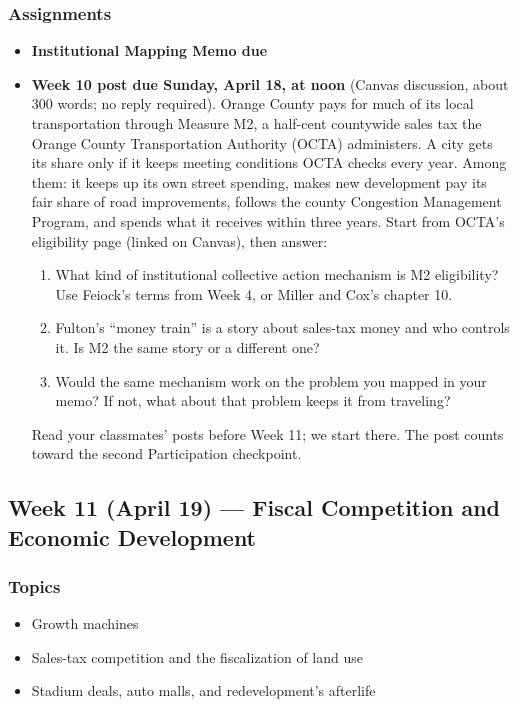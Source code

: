 \documentclass[12pt]{article}
\begin{document}
    \subsubsection*{Assignments}
        \begin{itemize}
            \item \textbf{Institutional Mapping Memo due}
            \item \textbf{Week 10 post due Sunday, April 18, at noon} (Canvas discussion, about 300 words; no reply required). Orange County pays for much of its local transportation through Measure M2, a half-cent countywide sales tax the Orange County Transportation Authority (OCTA) administers. A city gets its share only if it keeps meeting conditions OCTA checks every year. Among them: it keeps up its own street spending, makes new development pay its fair share of road improvements, follows the county Congestion Management Program, and spends what it receives within three years. Start from OCTA's eligibility page (linked on Canvas), then answer:
            \begin{enumerate}
                \item What kind of institutional collective action mechanism is M2 eligibility? Use Feiock's terms from Week 4, or Miller and Cox's chapter 10.
                \item Fulton's ``money train'' is a story about sales-tax money and who controls it. Is M2 the same story or a different one?
                \item Would the same mechanism work on the problem you mapped in your memo? If not, what about that problem keeps it from traveling?
            \end{enumerate}
            Read your classmates' posts before Week 11; we start there. The post counts toward the second Participation checkpoint.
        \end{itemize}

\subsection*{Week 11 (April 19) --- Fiscal Competition and Economic Development}
    \subsubsection*{Topics}
        \begin{itemize}
            \item Growth machines
            \item Sales-tax competition and the fiscalization of land use
            \item Stadium deals, auto malls, and redevelopment's afterlife
        \end{itemize}
\end{document}
